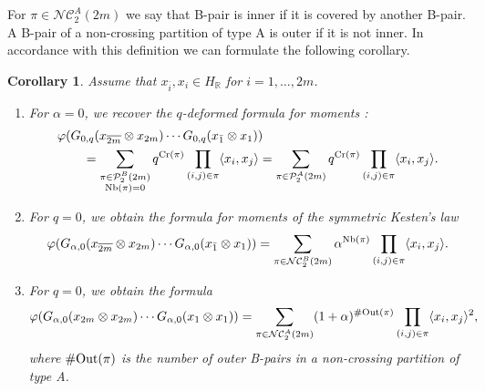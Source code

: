 \documentclass[pdftex]{sigma}
\numberwithin{equation}{section}
\newtheorem{Corollary}[Theorem]{Corollary}
\def\R{{\mathbb R}}
\def\state {\varphi}
\def\P{\mathcal{P}}
\def\NC{\mathcal{NC}}
\def\Out{\rm Out}
\def\PA{\mathcal{P}^{A}}
\def\Cr{\text{\normalfont Cr}}
\def\NB{\text{\normalfont Nb}}
\newcommand{\q}{q}
\newcommand{\s}{\alpha}%
\begin{document}
For $\pi \in \NC_2^A(2 m)$ we say that B-pair is inner if it is covered by another B-pair. A B-pair of a non-crossing partition of type A is outer if it is not inner.
In accordance with this definition we can formulate the following corollary.

\begin{Corollary}\label{cor13} Assume that $x_{\bar i},x_i \in H_\R$ for $i=1,\dots,2m$.
\begin{enumerate}\itemsep=0pt
\item[$1.$] For $\s=0$, we recover the $\q$-deformed formula for moments {\rm \cite[Proposition~2]{BozejkoSpeicher1991}:}
\begin{align*}
&\state(G_{0,\q}(x_{\overline{2m}}\otimes x_{2m})\cdots G_{0,\q}(x_{\bar 1}\otimes x_1))
\\
& \qquad =\sum_{\substack{ \pi \in \P^{B}_2(2 m)\\ \NB(\pi)=0 }} \q^{\Cr(\pi)}\prod_{(i,j) \in\pi }\langle x_i, x_j\rangle
=\sum_{\pi \in \PA_2(2 m)} \q^{\Cr(\pi)}\prod_{(i,j) \in\pi }\langle x_i, x_j\rangle.
\end{align*}
\item[$2.$] For $\q=0$, we obtain the formula for moments of the symmetric Kesten's law
\begin{align*}
\state( {G}_{\s,0}(x_{\overline{2m}}\otimes x_{2m})\cdots {G}_{\s,0}(x_{\bar 1}\otimes x_1) )
=\sum_{\pi \in \NC_2^B(2 m)} \s^{\NB(\pi)}\prod_{(i,j) \in\pi }\langle x_i, x_j\rangle.
\end{align*}
\item[$3.$] For $\q=0$, we obtain the formula
\begin{align*}
\state({G}_{\s,0}(x_{{2m}}\otimes x_{2m})\cdots {G}_{\s,0}(x_{ 1}\otimes x_1))
= \sum_{\pi \in \NC_2^A(2 m)} (1+\alpha)^{\#\Out(\pi)}\prod_{(i,j) \in\pi }\langle x_i, x_j\rangle^2,
\end{align*}
where $\#\Out(\pi)$ is the number of outer B-pairs in a non-crossing partition of type A.
\end{enumerate}
\end{Corollary}
\end{document}
